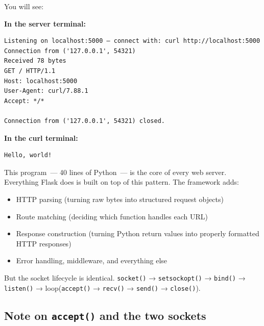 \noindent{}You will see:

\textbf{In the server terminal:}

\begin{outputbox}[short]
\begin{Verbatim}[fontsize=\codesize, breaklines, breakanywhere, breaksymbolleft={\tiny\textcolor{muted}{$\hookrightarrow$}}]
Listening on localhost:5000 — connect with: curl http://localhost:5000
Connection from ('127.0.0.1', 54321)
Received 78 bytes
GET / HTTP/1.1
Host: localhost:5000
User-Agent: curl/7.88.1
Accept: */*

Connection from ('127.0.0.1', 54321) closed.
\end{Verbatim}
\end{outputbox}

\noindent{}\textbf{In the curl terminal:}

\begin{outputbox}[short]
\begin{Verbatim}[fontsize=\codesize, breaklines, breakanywhere, breaksymbolleft={\tiny\textcolor{muted}{$\hookrightarrow$}}]
Hello, world!
\end{Verbatim}
\end{outputbox}

\noindent{}This program~--- 40 lines of Python~--- is the core of every web server. Everything Flask does is built on top of this pattern. The framework adds:

\begin{itemize}
\tightlist
\item
  HTTP parsing (turning raw bytes into structured request objects)
\item
  Route matching (deciding which function handles each URL)
\item
  Response construction (turning Python return values into properly formatted HTTP responses)
\item
  Error handling, middleware, and everything else
\end{itemize}

\noindent{}But the socket lifecycle is identical. \texttt{socket()} → \texttt{setsockopt()} → \texttt{bind()} → \texttt{listen()} → loop(\texttt{accept()} → \texttt{recv()} → \texttt{send()} → \texttt{close()}).

\subsection*{\texorpdfstring{Note on \texttt{accept()} and the two sockets}{Note on accept() and the two sockets}}\label{03-network-capability:note-on-accept-and-the-two-sockets}

